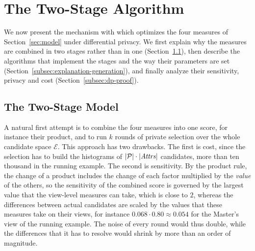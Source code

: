
\section{The Two-Stage Algorithm}\label{sec:solution}

We now present the mechanism with which \sys{} optimizes the four measures of Section~\ref{sec:model} under differential privacy.
We first explain why the measures are combined in two stages rather than in one (Section~\ref{subsec:two-stages}), then describe the algorithms that implement the stages and the way their parameters are set (Section~\ref{subsec:explanation-generation}), and finally analyze their sensitivity, privacy and cost (Section~\ref{subsec:dp-proof}).

\subsection{The Two-Stage Model}
\label{subsec:two-stages}

A natural first attempt is to combine the four measures into one score, for instance their product, and to run $k$ rounds of private selection over the whole candidate space $\mathcal{E}$.
This approach has two drawbacks.
The first is cost, since the selection has to build the histograms of $|\mathcal{P}|\cdot|\mathit{Attrs}|$ candidates, more than ten thousand in the running example.
The second is sensitivity.
By the product rule, the change of a product includes the change of each factor multiplied by the \emph{value} of the others, so the sensitivity of the combined score is governed by the largest value that the view-level measures can take, which is close to $2$, whereas the differences between actual candidates are scaled by the values that these measures take on their views, for instance $0.068\cdot0.80\approx0.054$ for the Master's view of the running example.
The noise of every round would thus double, while the differences that it has to resolve would shrink by more than an order of magnitude.

